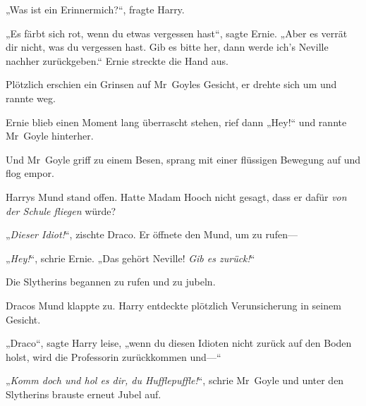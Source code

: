 „Was ist ein Erinnermich?“, fragte Harry.

„Es färbt sich rot, wenn du etwas vergessen hast“, sagte Ernie. „Aber es verrät dir nicht, was du vergessen hast. Gib es bitte her, dann werde ich’s Neville nachher zurückgeben.“ Ernie streckte die Hand aus.

Plötzlich erschien ein Grinsen auf Mr~Goyles Gesicht, er drehte sich um und rannte weg.

Ernie blieb einen Moment lang überrascht stehen, rief dann „Hey!“ und rannte Mr~Goyle hinterher.

Und Mr~Goyle griff zu einem Besen, sprang mit einer flüssigen Bewegung auf und flog empor.

Harrys Mund stand offen. Hatte Madam Hooch nicht gesagt, dass er dafür \emph{von der Schule fliegen} würde?

„\emph{Dieser Idiot!}“, zischte Draco. Er öffnete den Mund, um zu rufen—

„\emph{Hey!}“, schrie Ernie. „Das gehört Neville! \emph{Gib es zurück!}“

Die Slytherins begannen zu rufen und zu jubeln.

Dracos Mund klappte zu. Harry entdeckte plötzlich Verunsicherung in seinem Gesicht.

„Draco“, sagte Harry leise, „wenn du diesen Idioten nicht zurück auf den Boden holst, wird die Professorin zurückkommen und—“

„\emph{Komm doch und hol es dir, du Hufflepuffle!}“, schrie Mr~Goyle und unter den Slytherins brauste erneut Jubel auf.

